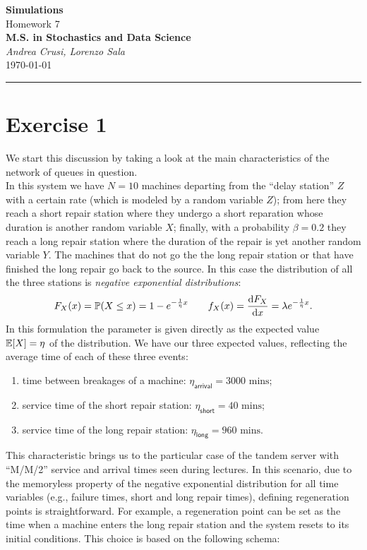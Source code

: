 \documentclass[12pt]{article}
\begin{document}
	\textcolor{UM_Brown}{
		\begin{center}
			\textbf{\Large Simulations}\\
			\vspace{5pt}
			Homework 7 \\
			\vspace{5pt}
			\textbf{M.S. in Stochastics and Data Science}\\
			\vspace{20pt}
			\textit{Andrea Crusi, Lorenzo Sala} \\
			\vspace{5pt}
			\today
		\end{center}
		\vspace{10pt}
		\hrule
	}
	
	
	
	
	\section{Exercise 1}
	We start this discussion by taking a look at the main characteristics of the network of queues in question.\\
	In this system we have $N=10$ machines departing from the ``delay station'' $Z$ with a certain rate (which is modeled by a random variable $Z$); from here they reach a short repair station where they undergo a short reparation whose duration is another random variable $X$; finally, with a probability $\beta=0.2$ they reach a long repair station where the duration of the repair is yet another random variable $Y$. The machines that do not go the the long repair station or that have finished the long repair go back to the source.
	In this case the distribution of all the three stations is \emph{negative exponential distributions}:
	\begin{equation*}
		F_X(x)=\mathbb{P}(X\leq x)=1-e^{-\frac{1}{\eta} x}\qquad f_X(x)=\frac{\mathop{}\!\mathrm{d} F_X}{\mathop{}\!\mathrm{d} x}=\lambda e^{-\frac{1}{\eta} x}.
	\end{equation*}
	In this formulation the parameter is given directly as the expected value $\mathbb{E}[X]=\eta$ of the distribution. We have our three expected values, reflecting the average time of each of these three events:
	\begin{enumerate}[\circnum]
		\item time between breakages of a machine: $\eta_{\mathsf{arrival}}=3000\text{ mins}$;
		\item service time of the short repair station: $\eta_{\mathsf{short}}=40\text{ mins}$;
		\item service time of the long repair station: $\eta_{\mathsf{long}}=960\text{ mins}$.
	\end{enumerate}
	This characteristic brings us to the particular case of the tandem server with ``M/M/2'' service and arrival times seen during lectures. 
In this scenario, due to the memoryless property of the negative exponential distribution for all time variables (e.g., failure times, short and long repair times), defining regeneration points is straightforward. For example, a regeneration point can be set as the time when a machine enters the long repair station and the system resets to its initial conditions. This choice is based on the following schema:
		
\end{document}
